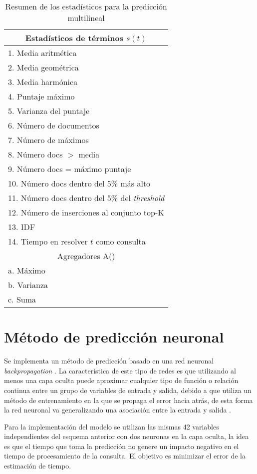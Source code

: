 \begin{table}[!ht]
\centering
\caption{Resumen de los estadísticos para la predicción multilineal}
\begin{tabular}{|l|}
\hline
\multicolumn{1}{|c|}{Estadísticos de términos $s(t)$} \\ \hline
1. Media aritmética \\ 
2. Media geométrica \\ 
3. Media harmónica \\ 
4. Puntaje máximo \\ 
5. Varianza del puntaje \\ 
6. Número de documentos \\ 
7. Número de máximos \\ 
8. Número docs $>$ media \\ 
9. Número docs = máximo puntaje \\ 
10. Número docs dentro del 5\% más alto \\
11. Número docs dentro del 5\% del \textit{threshold} \\ 
12. Número de inserciones al conjunto top-K \\ 
13. IDF \\ 
14. Tiempo en resolver $t$ como consulta \\ \hline
\multicolumn{1}{|c|}{Agregadores A()} \\ \hline
a. Máximo \\ 
b. Varianza  \\ 
c. Suma \\ \hline
\end{tabular}
\label{tabla:estadisticosGlasgow}
\end{table}

\section{Método de predicción neuronal}
\label{scheduling:neuronal}
Se implementa un método de predicción basado en una red neuronal \textit{backpropagation} \citep{Rumelhart:1988}. La característica de este tipo de redes es que utilizando al menos una capa oculta puede aproximar cualquier tipo de función o relación continua entre un grupo de variables de entrada y salida, debido a que utiliza un método de entrenamiento en la que se propaga el error hacia atrás, de esta forma la red neuronal va generalizando una asociación entre la entrada y salida \citep{Fausett:1994}. 

Para la implementación del modelo se utilizan las mismas 42 variables independientes del esquema anterior con dos neuronas en la capa oculta, la idea es que el tiempo que toma la predicción no genere un impacto negativo en el tiempo de procesamiento de la consulta. El objetivo es minimizar el error de la estimación de tiempo.